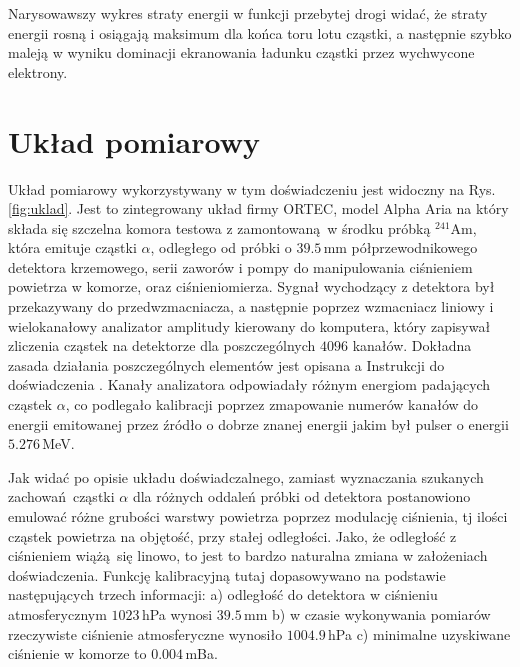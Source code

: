 \documentclass[12pt,a4paper]{article}
\begin{document}
Narysowawszy wykres straty energii w funkcji przebytej drogi widać, że straty energii rosną i osiągają maksimum dla końca toru lotu cząstki, a następnie szybko maleją w wyniku dominacji ekranowania ładunku cząstki przez wychwycone elektrony.

\section{Układ pomiarowy}

Układ pomiarowy wykorzystywany w tym doświadczeniu jest widoczny na Rys. \ref{fig:uklad}. Jest to zintegrowany układ firmy ORTEC, model Alpha Aria na który składa się szczelna komora testowa z zamontowaną w środku próbką $^{241}$Am, która emituje cząstki $\alpha$, odległego od próbki o $39.5$\,mm półprzewodnikowego detektora krzemowego, serii zaworów i pompy do manipulowania ciśnieniem powietrza w komorze, oraz ciśnieniomierza. Sygnał wychodzący z detektora był przekazywany do przedwzmacniacza, a następnie poprzez wzmacniacz liniowy i wielokanałowy analizator amplitudy kierowany do komputera, który zapisywał zliczenia cząstek na detektorze dla poszczególnych $4096$ kanałów. Dokładna zasada działania poszczególnych elementów jest opisana a Instrukcji do doświadczenia \cite{instrukcja}. Kanały analizatora odpowiadały różnym energiom padających cząstek $\alpha$, co podlegało kalibracji poprzez zmapowanie numerów kanałów do energii emitowanej przez źródło o dobrze znanej energii jakim był pulser o energii $5.276$\,MeV. 

Jak widać po opisie układu doświadczalnego, zamiast wyznaczania szukanych zachowań cząstki $\alpha$ dla różnych oddaleń próbki od detektora postanowiono emulować różne grubości warstwy powietrza poprzez modulację ciśnienia, tj ilości cząstek powietrza na objętość, przy stałej odległości. Jako, że odległość z ciśnieniem wiążą się linowo, to jest to bardzo naturalna zmiana w założeniach doświadczenia. Funkcję kalibracyjną tutaj dopasowywano na podstawie następujących trzech informacji: a) odległość do detektora w ciśnieniu atmosferycznym $1023$\,hPa wynosi $39.5$\,mm b) w czasie wykonywania pomiarów rzeczywiste ciśnienie atmosferyczne wynosiło $1004.9$\,hPa c) minimalne uzyskiwane ciśnienie w komorze to $0.004$\,mBa.
\end{document}
